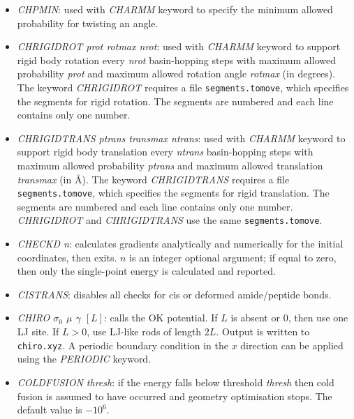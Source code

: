 \documentclass[12pt,a4paper,dvips]{article}
\begin{document}
\begin{itemize}
\item{\it CHPMIN}: used with {\it CHARMM} keyword to specify the minimum allowed
probability for twisting an angle.

\item{\it CHRIGIDROT prot rotmax nrot}: used with {\it CHARMM} keyword 
to support rigid body rotation every {\it nrot} basin-hopping steps with maximum allowed 
probability {\it prot} and maximum allowed rotation angle {\it rotmax} (in degrees). 
The keyword {\it CHRIGIDROT} requires a file {\tt segments.tomove}, which specifies
the segments for rigid rotation. The segments are numbered and each line contains only one number.

\item{\it CHRIGIDTRANS ptrans transmax ntrans}: used with {\it CHARMM} keyword 
to support rigid body translation every {\it ntrans} basin-hopping steps with maximum allowed 
probability {\it ptrans} and maximum allowed translation {\it transmax} (in \AA). 
The keyword {\it CHRIGIDTRANS} requires a file {\tt segments.tomove}, which specifies
the segments for rigid translation. The segments are numbered and each line contains only one number.
{\it CHRIGIDROT} and {\it CHRIGIDTRANS} use the same {\tt segments.tomove}.


\item {\it CHECKD n\/}: calculates gradients analytically and numerically for the initial coordinates, then exits. $n$ is an 
integer optional argument; if equal to zero, then only the single-point energy is calculated and reported.

\item {\it CISTRANS\/}: disables all checks for cis or deformed amide/peptide bonds.

\item {\it CHIRO $\sigma_0$ $\mu$ $\gamma$ $[L]$}: calls the OK potential. If $L$ is absent or $0$, then use one LJ site. If $L > 0$, use LJ-like rods of length $2L$. Output is written to {\tt chiro.xyz}. A periodic boundary condition in the $x$ direction can be applied using the {\it PERIODIC} keyword.

\item {\it COLDFUSION thresh\/}: if the energy falls below threshold {\it thresh} then
cold fusion is assumed to have occurred and geometry optimisation stops.
The default value is $-10^6$.


\end{itemize}
\end{document}
